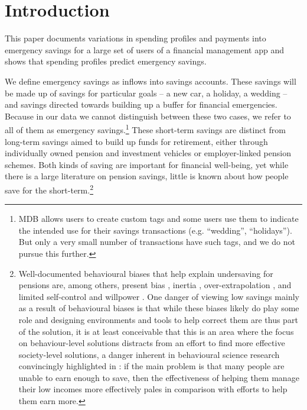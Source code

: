 
\section{Introduction}%
\label{sec:introduction}

This paper documents variations in spending profiles and payments into
emergency savings for a large set of users of a financial management app
and shows that spending profiles predict emergency savings.

We define emergency savings as inflows into savings accounts. These savings
will be made up of savings for particular goals -- a new car, a holiday, a
wedding -- and savings directed towards building up a buffer for financial
emergencies. Because in our data we cannot distinguish between these two cases,
we refer to all of them as emergency savings.\footnote{MDB allows users to
    create custom tags and some users use them to indicate the intended use for
    their savings transactions (e.g. ``wedding'', ``holidays''). But only a very
small number of transactions have such tags, and we do not pursue this
further.} These short-term savings are distinct from long-term savings aimed to
build up funds for retirement, either through individually owned pension and
investment vehicles or employer-linked pension schemes. Both kinds of saving
are important for financial well-being, yet while there is a large literature
on pension savings, little is known about how people save for the
short-term.\footnote{Well-documented behavioural biases that help explain
    undersaving for pensions are, among others, present bias
    \citep{laibson1997golden, laibson2019intertemporal}, inertia
    \citep{madrian2001power}, over-extrapolation \citep{choi2009reinforcement},
    and limited self-control and willpower \citep{thaler1981economic,
    benhabib2005modeling, fudenberg2006dual, loewenstein2004animal,
gul2001temptation}. One danger of viewing low savings mainly as a result of
behavioural biases is that while these biases likely do play some role and
designing environments and tools to help correct them are thus part of the
solution, it is at least conceivable that this is an area where the focus on
behaviour-level solutions distracts from an effort to find more effective
society-level solutions, a danger inherent in behavioural science research
convincingly highlighted in \citet{chater2022frame}: if the main problem is
that many people are unable to earn enough to save, then the effectiveness of
helping them manage their low incomes more effectively pales in comparison with
efforts to help them earn more.}

